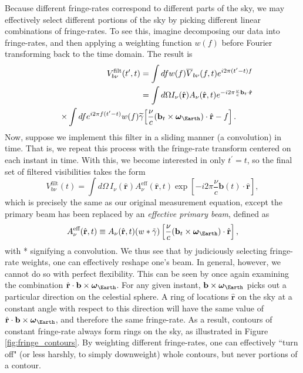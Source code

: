 \documentclass[twocolumn,apj,numberedappendix]{emulateapj}
\newcommand{\rhat}{\hat{\mathbf{r}}}
\begin{document}
Because different fringe-rates correspond to different parts of the sky, we may effectively select different portions of the sky by picking different linear combinations of fringe-rates. To see this, imagine decomposing our data into fringe-rates, and then applying a weighting function $w(f)$ before Fourier transforming back to the time domain. The result is
\begin{eqnarray}
&&V^\textrm{filt}_{b \nu}(t^\prime,t) = \int df w(f) \overline{V}_{b\nu} (f,t) e^{i 2\pi  (t^\prime-t) f} \nonumber \\
&&=  \int d\Omega I_\nu(\rhat) A_{\nu} (\rhat,t) e^{-i2 \pi \frac{ \nu}{c} \mathbf{b}_t \cdot \rhat } \nonumber \\
&& \times \int df e^{i 2\pi f (t^\prime-t)} w(f)  \widetilde{\gamma} \! \left[ \frac{\nu}{c} (\mathbf{b}_t \times \boldsymbol \omega_\Earth) \cdot \rhat -f \right].\qquad
\end{eqnarray}
Now, suppose we implement this filter in a sliding manner (a convolution) in time. That is, we repeat this process with the fringe-rate transform centered on each instant in time. With this, we become interested in only $t^\prime = t$, so the final set of filtered visibilities takes the form
\begin{equation}
\label{eq:ShrunkBeam}
V^\textrm{filt}_{b\nu}(t) = \int d\Omega \, {I_\nu(\rhat) A^\textrm{eff}_{\nu} (\rhat, t)\exp \left[-i2\pi \frac{\nu}{c}  \mathbf{b}(t) \cdot \rhat\right]},
\end{equation}
which is precisely the same as our original measurement equation, except the primary beam has been replaced by an \emph{effective primary beam}, defined as
\begin{equation}
\label{eq:EffectiveBeamDef}
A^\textrm{eff}_{\nu} (\rhat, t)\equiv A_{\nu} (\rhat, t) (w * \tilde{\gamma}) \left[ \frac{\nu}{c} (\mathbf{b}_t \times \boldsymbol \omega_\Earth) \cdot \rhat  \right],
\end{equation}
with * signifying a convolution. We thus see that by judiciously selecting fringe-rate weights, one can effectively reshape one's beam. In general, however, we cannot do so with perfect flexibility. This can be seen by once again examining the combination $\rhat \cdot \mathbf{b} \times  \boldsymbol \omega_\Earth$. For any given instant, $\mathbf{b} \times \boldsymbol \omega_\Earth$ picks out a particular direction on the celestial sphere. A ring of locations $\rhat$ on the sky at a constant angle with respect to this direction will have the same value of $\rhat \cdot  \mathbf{b} \times \boldsymbol \omega_\Earth$, and therefore the same fringe-rate. As a result, contours of constant fringe-rate always form rings on the sky, as illustrated in Figure \ref{fig:fringe_contours}. By weighting different fringe-rates, one can effectively ``turn off" (or less harshly, to simply downweight) whole contours, but never portions of a contour.
\end{document}
